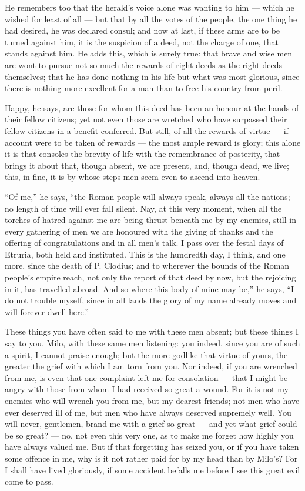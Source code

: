  He remembers too that the herald's voice alone was wanting to him --- which he wished for least of all --- but that by all the votes of the people, the one thing he had desired, he was declared consul; and now at last, if these arms are to be turned against him, it is the suspicion of a deed, not the charge of one, that stands against him. He adds this, which is surely true: that brave and wise men are wont to pursue not so much the rewards of right deeds as the right deeds themselves; that he has done nothing in his life but what was most glorious, since there is nothing more excellent for a man than to free his country from peril.

 Happy, he says, are those for whom this deed has been an honour at the hands of their fellow citizens; yet not even those are wretched who have surpassed their fellow citizens in a benefit conferred. But still, of all the rewards of virtue --- if account were to be taken of rewards --- the most ample reward is glory; this alone it is that consoles the brevity of life with the remembrance of posterity, that brings it about that, though absent, we are present, and, though dead, we live; this, in fine, it is by whose steps men seem even to ascend into heaven.

 ``Of me,'' he says, ``the Roman people will always speak, always all the nations; no length of time will ever fall silent. Nay, at this very moment, when all the torches of hatred against me are being thrust beneath me by my enemies, still in every gathering of men we are honoured with the giving of thanks and the offering of congratulations and in all men's talk. I pass over the festal days of Etruria, both held and instituted. This is the hundredth day, I think, and one more, since the death of P. Clodius; and to wherever the bounds of the Roman people's empire reach, not only the report of that deed by now, but the rejoicing in it, has travelled abroad. And so where this body of mine may be,'' he says, ``I do not trouble myself, since in all lands the glory of my name already moves and will forever dwell here.''

 These things you have often said to me with these men absent; but these things I say to you, Milo, with these same men listening: you indeed, since you are of such a spirit, I cannot praise enough; but the more godlike that virtue of yours, the greater the grief with which I am torn from you. Nor indeed, if you are wrenched from me, is even that one complaint left me for consolation --- that I might be angry with those from whom I had received so great a wound. For it is not my enemies who will wrench you from me, but my dearest friends; not men who have ever deserved ill of me, but men who have always deserved supremely well. You will never, gentlemen, brand me with a grief so great --- and yet what grief could be so great? --- no, not even this very one, as to make me forget how highly you have always valued me. But if that forgetting has seized you, or if you have taken some offence in me, why is it not rather paid for by my head than by Milo's? For I shall have lived gloriously, if some accident befalls me before I see this great evil come to pass.

